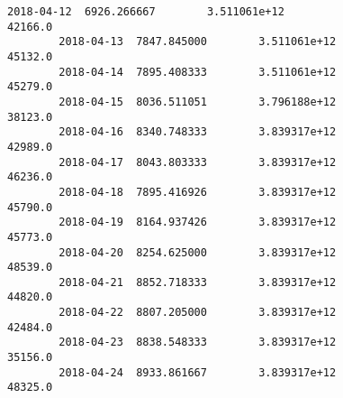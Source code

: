 \documentclass[11pt]{article}
\begin{document}
\begin{Verbatim}[commandchars=\\\{\}]
        2018-04-12  6926.266667        3.511061e+12                          42166.0   
        2018-04-13  7847.845000        3.511061e+12                          45132.0   
        2018-04-14  7895.408333        3.511061e+12                          45279.0   
        2018-04-15  8036.511051        3.796188e+12                          38123.0   
        2018-04-16  8340.748333        3.839317e+12                          42989.0   
        2018-04-17  8043.803333        3.839317e+12                          46236.0   
        2018-04-18  7895.416926        3.839317e+12                          45790.0   
        2018-04-19  8164.937426        3.839317e+12                          45773.0   
        2018-04-20  8254.625000        3.839317e+12                          48539.0   
        2018-04-21  8852.718333        3.839317e+12                          44820.0   
        2018-04-22  8807.205000        3.839317e+12                          42484.0   
        2018-04-23  8838.548333        3.839317e+12                          35156.0   
        2018-04-24  8933.861667        3.839317e+12                          48325.0   
        

\end{Verbatim}
\end{document}
